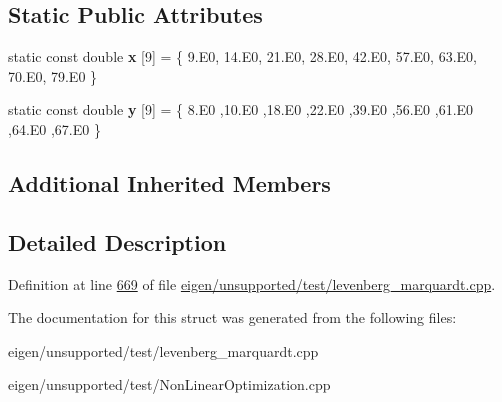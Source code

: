 \subsection*{Static Public Attributes}
\begin{DoxyCompactItemize}
\item 
\mbox{\label{structrat42__functor_aa42c40408d2cbd0cc83fbd94e2e48a5b}} 
static const double {\bfseries x} \mbox{[}9\mbox{]} = \{ 9.\+E0, 14.\+E0, 21.\+E0, 28.\+E0, 42.\+E0, 57.\+E0, 63.\+E0, 70.\+E0, 79.\+E0 \}
\item 
\mbox{\label{structrat42__functor_a75552253451e7d4ffbeeb5e596cbbdb1}} 
static const double {\bfseries y} \mbox{[}9\mbox{]} = \{ 8.\+E0 ,10.\+E0 ,18.\+E0 ,22.\+E0 ,39.\+E0 ,56.\+E0 ,61.\+E0 ,64.\+E0 ,67.\+E0 \}
\end{DoxyCompactItemize}
\subsection*{Additional Inherited Members}


\subsection{Detailed Description}


Definition at line \hyperlink{eigen_2unsupported_2test_2levenberg__marquardt_8cpp_source_l00669}{669} of file \hyperlink{eigen_2unsupported_2test_2levenberg__marquardt_8cpp_source}{eigen/unsupported/test/levenberg\+\_\+marquardt.\+cpp}.



The documentation for this struct was generated from the following files\+:\begin{DoxyCompactItemize}
\item 
eigen/unsupported/test/levenberg\+\_\+marquardt.\+cpp\item 
eigen/unsupported/test/\+Non\+Linear\+Optimization.\+cpp\end{DoxyCompactItemize}
